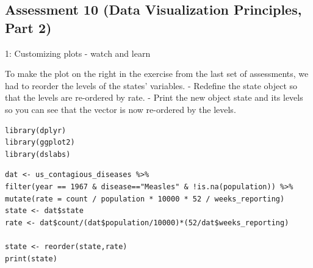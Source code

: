\documentclass[
]{article}
\begin{document}
\hypertarget{assessment-10-data-visualization-principles-part-2}{%
\subsection{Assessment 10 (Data Visualization Principles, Part
2)}\label{assessment-10-data-visualization-principles-part-2}}

1: Customizing plots - watch and learn

To make the plot on the right in the exercise from the last set of
assessments, we had to reorder the levels of the states' variables. -
Redefine the state object so that the levels are re-ordered by rate. -
Print the new object state and its levels so you can see that the vector
is now re-ordered by the levels.

\begin{verbatim}
library(dplyr)
library(ggplot2)
library(dslabs)
\end{verbatim}

\begin{verbatim}
dat <- us_contagious_diseases %>%
filter(year == 1967 & disease=="Measles" & !is.na(population)) %>% mutate(rate = count / population * 10000 * 52 / weeks_reporting)
state <- dat$state 
rate <- dat$count/(dat$population/10000)*(52/dat$weeks_reporting)

state <- reorder(state,rate)
print(state)
\end{verbatim}
\end{document}
